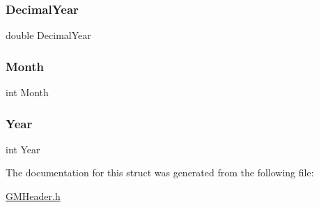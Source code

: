 \mbox{\label{struct_g_mtype___date_afb8201d541b7b916e28bdf9884f6c794}} 
\subsubsection{\texorpdfstring{DecimalYear}{DecimalYear}}
{\footnotesize\ttfamily double Decimal\+Year}

\mbox{\label{struct_g_mtype___date_a530b376ec91a278ac98531d3ea17f148}} 
\subsubsection{\texorpdfstring{Month}{Month}}
{\footnotesize\ttfamily int Month}

\mbox{\label{struct_g_mtype___date_a42e645110404fbf4f10235789577fa32}} 
\subsubsection{\texorpdfstring{Year}{Year}}
{\footnotesize\ttfamily int Year}



The documentation for this struct was generated from the following file\+:\begin{DoxyCompactItemize}
\item 
\mbox{\hyperlink{_g_m_header_8h}{G\+M\+Header.\+h}}\end{DoxyCompactItemize}
